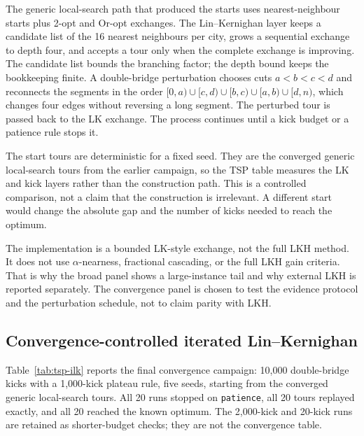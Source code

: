 \documentclass[pdflatex,sn-mathphys-num]{sn-jnl}
\begin{document}
The generic local-search path that produced the starts uses nearest-neighbour starts plus 2-opt and
Or-opt exchanges. The Lin--Kernighan layer keeps a candidate list of the 16 nearest neighbours per city, grows a sequential
exchange to depth four, and accepts a tour only when the complete exchange is improving. The
candidate list bounds the branching factor; the depth bound keeps the bookkeeping finite. A
double-bridge perturbation chooses cuts $a<b<c<d$ and reconnects the segments in the order
$[0,a)\cup[c,d)\cup[b,c)\cup[a,b)\cup[d,n)$, which changes four edges without reversing a long
segment. The perturbed tour is passed back to the LK exchange. The process continues until a kick
budget or a patience rule stops it.

The start tours are deterministic for a fixed seed. They are the converged generic local-search
tours from the earlier campaign, so the TSP table measures the LK and kick layers rather than the
construction path. This is a controlled comparison, not a claim that the
construction is irrelevant. A different start would change the absolute gap and the number of kicks
needed to reach the optimum.

The implementation is a bounded LK-style exchange, not the full LKH method. It does not use
$\alpha$-nearness, fractional cascading, or the full LKH gain criteria. That is why the broad panel
shows a large-instance tail and why external LKH is reported separately. The convergence panel is
chosen to test the evidence protocol and the perturbation schedule, not to claim parity with LKH.

\subsection{Convergence-controlled iterated Lin--Kernighan}

Table~\ref{tab:tsp-ilk} reports the final convergence campaign: 10,000 double-bridge kicks with a
1,000-kick plateau rule, five seeds, starting from the converged generic local-search tours. All 20 runs stopped on
\texttt{patience}, all 20 tours replayed exactly, and all 20 reached the known optimum. The 2,000-kick
and 20-kick runs are retained as shorter-budget checks; they are not the convergence table.
\end{document}
